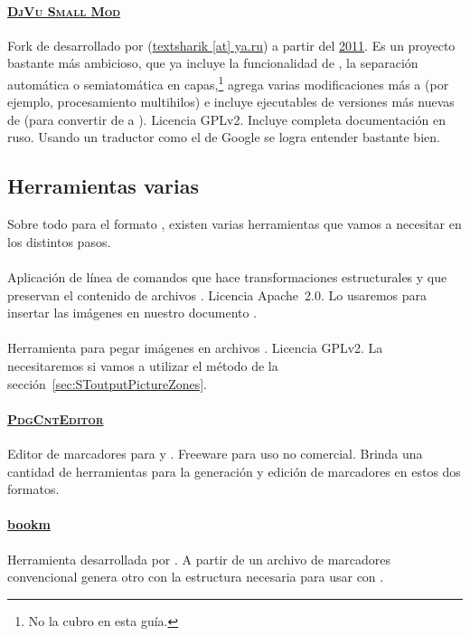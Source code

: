 \documentclass[%
	a5paper,
	10pt,
	twoside,
	openright,
	final,
]{memoir}
\begin{document}
	\paragraph{\href{https://book-scan.wixsite.com/djvu}{\textsc{DjVu Small Mod}}} Fork de \djvusmall desarrollado por \textsharik (\href{mailto:textsharik@ya.ru}{textsharik [at] ya.ru}) a partir del \href{http://www.djvu-scan.ru/forum/index.php?topic=1099.0}{2011}. Es un proyecto bastante más ambicioso, que ya incluye la funcionalidad de \djvuimager, la separación automática o semiatomática en capas,\footnote{No la cubro en esta guía.} agrega varias modificaciones más a  (por ejemplo, procesamiento multihilos) e incluye ejecutables de versiones más nuevas de \dexpress (para convertir de \djvu a \pdf). Licencia GPLv2. Incluye completa documentación en ruso. Usando un traductor como el de Google se logra entender bastante bien.

	\subsection{Herramientas varias} Sobre todo para el formato \djvu, existen varias herramientas que vamos a necesitar en los distintos pasos.
	\paragraph{\href{http://qpdf.sourceforge.net/}{\qpdf}} Aplicación de línea de comandos que hace transformaciones estructurales y que preservan el contenido de archivos \pdf. Licencia Apache~2.0. Lo usaremos para insertar las imágenes en nuestro documento \pdf.
	\paragraph{\href{http://www.djvu-soft.narod.ru/scan/djvu_imager_en.htm}{\djvuimager}} Herramienta para pegar imágenes en archivos \djvu. Licencia GPLv2. La necesitaremos si vamos a utilizar el método de la sección~\ref{sec:SToutputPictureZones}.
	\paragraph{\href{http://www.cnblogs.com/stronghorse/}{\textsc{PdgCntEditor}}} Editor de marcadores para \pdf y \djvu. Freeware para uso no comercial. Brinda una cantidad de herramientas para la generación y edición de marcadores en estos dos formatos.
	\paragraph{\href{http://www.djvu-scan.ru/forum/index.php?topic=320}{bookm}} Herramienta desarrollada por \mondaytwothousand. A partir de un archivo de marcadores convencional genera otro con la estructura necesaria para usar con .
\end{document}
